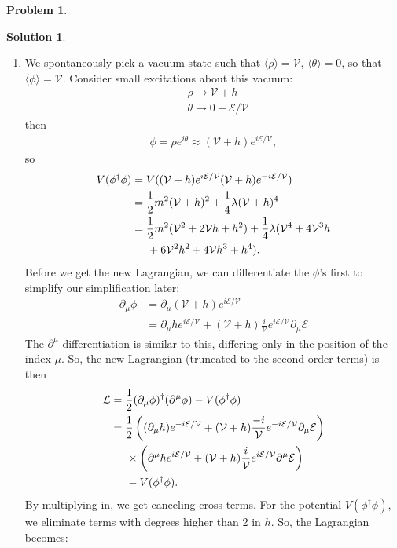 \documentclass{book}
\numberwithin{equation}{section}
\theoremstyle{definition}
\newtheorem{prob}{Problem}[section]
\newtheorem{sln}{Solution}[section]
\newcommand{\p}{\partial}
\newcommand{\lag}{\mathcal{L}}
\newcommand{\E}{\mathcal{E}}
\newcommand{\V}{\mathcal{V}}
\begin{document}
\begin{prob}
\begin{sln}
\begin{enumerate}
			\item We spontaneously pick a vacuum state such that $\langle\rho\rangle = \V$, $\langle \theta \rangle = 0$, so that $\langle \phi \rangle = \V$. Consider small excitations about this vacuum: 
			\begin{align}
			&\rho \to \V + h\\
			&\theta \to 0 + \E/\V
			\end{align} 
			then
			\begin{align}
			\phi = \rho e^{i\theta} \approx (\V+h)e^{i\E/\V},
			\end{align}
			so
			\begin{align}
			V(\phi^\dagger\phi) &= V((\V+h)e^{i\E/\V}(\V+h)e^{-i\E/\V})\nonumber\\
			&= \frac{1}{2}m^2(\V + h)^2 + \frac{1}{4}\lambda(\V+h)^4\nonumber\\
			&= \frac{1}{2}m^2(\V^2 + 2\V h + h^2) + \frac{1}{4}\lambda(\V^4 + 4\V^3h\nonumber\\
			&\hspace{0.5cm}+ 6\V^2h^2 + 4\V h^3 + h^4).
			\end{align}
			Before we get the new Lagrangian, we can differentiate the $\phi$'s first to simplify our simplification later:
			\begin{align}
			\p_\mu \phi &= \p_\mu (\V + h)e^{i\E/\V}\nonumber\\
			&= \p_\mu h e^{i\E/\V} + (\V + h)\frac{i}{\V}e^{i\E/\V}\p_\mu\E
			\end{align}
			The $\p^\mu$ differentiation is similar to this, differing only in the position of the index $\mu$. So, the new Lagrangian (truncated to the second-order terms) is then
			\begin{align}
			\lag &= \frac{1}{2}(\p_\mu\phi)^\dagger(\p^\mu \phi) - V(\phi^\dagger\phi)\nonumber\\
			&= \frac{1}{2}\left((\p_\mu h) e^{-i\E/\V} + (\V + h)\frac{-i}{\V}e^{-i\E/\V}\p_\mu\E\right)\nonumber\\
			&\hspace{0.5cm}\times \left(\p^\mu h e^{i\E/\V} + (\V + h)\frac{i}{\V}e^{i\E/\V}\p^\mu\E\right)\nonumber\\
			&\hspace{0.5cm} - V(\phi^\dagger\phi).
			\end{align}
			By multiplying in, we get canceling cross-terms. For the potential $V(\phi^\dagger\phi)$, we eliminate terms with degrees higher than 2 in $h$. So, the Lagrangian becomes:
			\begin{align}

\end{align}
\end{enumerate}
\end{sln}
\end{prob}
\end{document}
